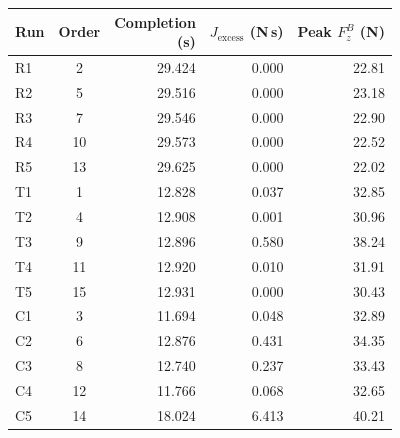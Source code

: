 \begin{tabular}{lcrrr}
\toprule
Run & Order & \makecell{Completion\\(s)} & \makecell{$J_{\mathrm{excess}}$\\(N\,s)} & \makecell{Peak $F_z^B$\\(N)} \\
\midrule
R1 & 2 & 29.424 & 0.000 & 22.81 \\
R2 & 5 & 29.516 & 0.000 & 23.18 \\
R3 & 7 & 29.546 & 0.000 & 22.90 \\
R4 & 10 & 29.573 & 0.000 & 22.52 \\
R5 & 13 & 29.625 & 0.000 & 22.02 \\
T1 & 1 & 12.828 & 0.037 & 32.85 \\
T2 & 4 & 12.908 & 0.001 & 30.96 \\
T3 & 9 & 12.896 & 0.580 & 38.24 \\
T4 & 11 & 12.920 & 0.010 & 31.91 \\
T5 & 15 & 12.931 & 0.000 & 30.43 \\
C1 & 3 & 11.694 & 0.048 & 32.89 \\
C2 & 6 & 12.876 & 0.431 & 34.35 \\
C3 & 8 & 12.740 & 0.237 & 33.43 \\
C4 & 12 & 11.766 & 0.068 & 32.65 \\
C5 & 14 & 18.024 & 6.413 & 40.21 \\
\bottomrule
\end{tabular}

